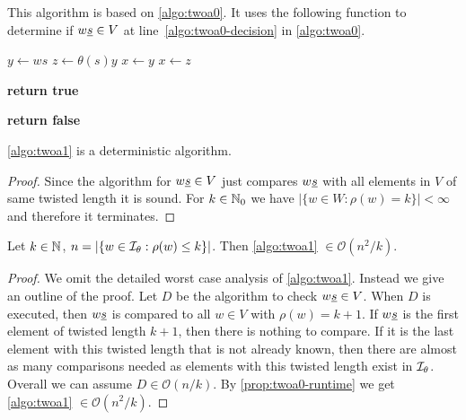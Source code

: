 \begin{algo}[TWOA1]
	This algorithm is based on \ref{algo:twoa0}. It uses the following function to determine if $w \underline{s} \in V$ at line~\ref{algo:twoa0-decision} in \ref{algo:twoa0}.

	\begin{algorithmic}[1]
		\State $y \gets ws$
		\State $z \gets \theta(s)y$
		 
			\State $x \gets y$
		\Else
			\State $x \gets z$
		\EndIf
		
		 \label{algo:twoa1-comp} 
			 
				\State \textbf{return true}
			\EndIf
		\EndFor
		
		\State \textbf{return false}
	\EndProcedure
	\end{algorithmic}
\end{algo}

\begin{lemm}
	\ref{algo:twoa1} is a deterministic algorithm.

	\begin{proof}
		Since the algorithm for $w \underline{s} \in V$ just compares $w \underline{s}$ with all elements in $V$ of same twisted length it is sound. For $k \in \mathbb{N}_0$ we have $|\{ w \in W : \rho(w) = k \}| < \infty$ and therefore it terminates.
	\end{proof}
\end{lemm}

\begin{lemm}
	Let $k \in \mathbb{N}$, $n = |\{ w \in \mathcal{I}_{\theta} : \rho(w) \leq k \}|$. Then \ref{algo:twoa1} $\in \mathcal{O}(n^2/k)$.

	\begin{proof}
		We omit the detailed worst case analysis of \ref{algo:twoa1}. Instead we give an outline of the proof. Let $D$ be the algorithm to check $w \underline{s} \in V$. When $D$ is executed, then $w \underline{s}$ is compared to all $w \in V$ with $\rho(w) = k+1$. If $w \underline{s}$ is the first element of twisted length $k + 1$, then there is nothing to compare. If it is the last element with this twisted length that is not already known, then there are almost as many comparisons needed as elements with this twisted length exist in $\mathcal{I}_{\theta}$. Overall we can assume $D \in \mathcal{O}(n/k)$. By \ref{prop:twoa0-runtime} we get \ref{algo:twoa1} $\in \mathcal{O}(n^2/k)$.
	\end{proof}
\end{lemm}

